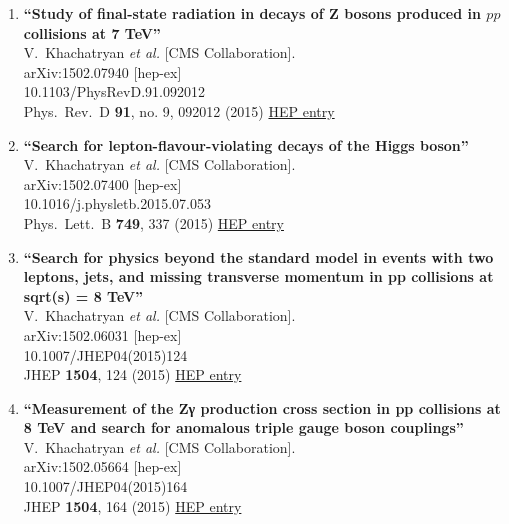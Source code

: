 \documentclass{article}
\begin{document}
\begin{enumerate}
\item%
{\bf ``Study of final-state radiation in decays of Z bosons produced in $pp$ collisions at 7 TeV''}
  \\{}V.~Khachatryan {\it et al.} [CMS Collaboration].
  \\{}arXiv:1502.07940 [hep-ex]
    \\{}10.1103/PhysRevD.91.092012
\\{}Phys.\ Rev.\ D {\bf 91}, no. 9, 092012 (2015) %
\href{http://inspirehep.net/record/1346843}{HEP entry}



\item%
{\bf ``Search for lepton-flavour-violating decays of the Higgs boson''}
  \\{}V.~Khachatryan {\it et al.} [CMS Collaboration].
  \\{}arXiv:1502.07400 [hep-ex]
    \\{}10.1016/j.physletb.2015.07.053
\\{}Phys.\ Lett.\ B {\bf 749}, 337 (2015) %
\href{http://inspirehep.net/record/1346512}{HEP entry}


\item%
{\bf ``Search for physics beyond the standard model in events with two leptons, jets, and missing transverse momentum in pp collisions at sqrt(s) = 8 TeV''}
  \\{}V.~Khachatryan {\it et al.} [CMS Collaboration].
  \\{}arXiv:1502.06031 [hep-ex]
    \\{}10.1007/JHEP04(2015)124
\\{}JHEP {\bf 1504}, 124 (2015) %
\href{http://inspirehep.net/record/1345823}{HEP entry}


\item%
{\bf ``Measurement of the Zγ production cross section in pp collisions at 8 TeV and search for anomalous triple gauge boson couplings''}
  \\{}V.~Khachatryan {\it et al.} [CMS Collaboration].
  \\{}arXiv:1502.05664 [hep-ex]
    \\{}10.1007/JHEP04(2015)164
\\{}JHEP {\bf 1504}, 164 (2015) %
\href{http://inspirehep.net/record/1345354}{HEP entry}



\end{enumerate}
\end{document}
